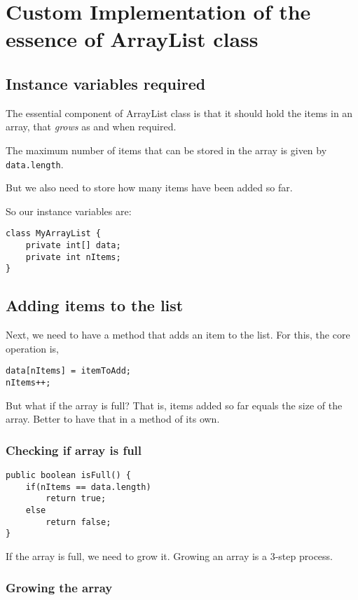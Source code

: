 \section{Custom Implementation of the essence of ArrayList class}

\subsection{Instance variables required}

The essential component of ArrayList class is that it should hold the items in an array, that \emph{grows} as and when required.

The maximum number of items that can be stored in the array is given by \texttt{data.length}.

But we also need to store how many items have been added so far.

So our instance variables are:

\begin{lstlisting}
class MyArrayList {
	private int[] data;
	private int nItems;	
}
\end{lstlisting}

\subsection{Adding items to the list}

Next, we need to have a method that adds an item to the list. For this, the core operation is,

\begin{lstlisting}
data[nItems] = itemToAdd;
nItems++;	
\end{lstlisting}

But what if the array is full? That is, items added so far equals the size of the array. Better to have that in a method of its own.

\subsubsection{Checking if array is full}

\begin{lstlisting}
public boolean isFull() {
	if(nItems == data.length)
		return true;
	else
		return false;
}
\end{lstlisting}

If the array is full, we need to grow it. Growing an array is a 3-step process.

\subsubsection{Growing the array}

